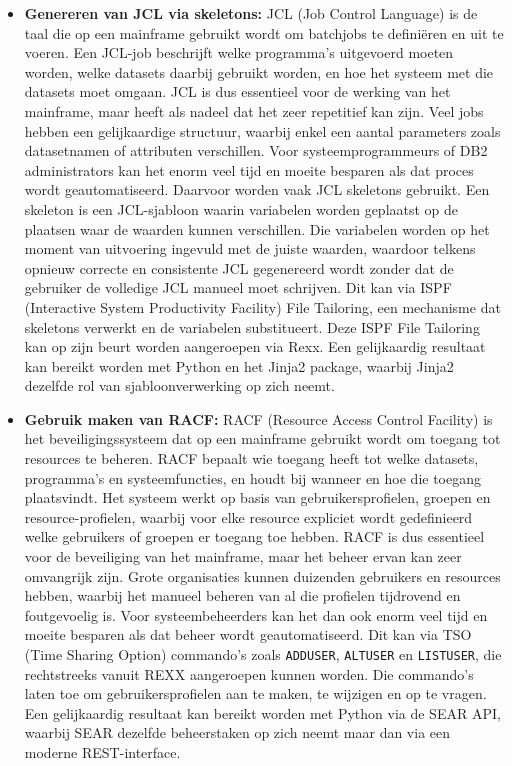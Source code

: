 \begin{itemize}
    \item \textbf{Genereren van JCL via skeletons:} JCL (Job Control Language) is de taal die op een mainframe gebruikt wordt om batchjobs te definiëren en uit te voeren. Een JCL-job beschrijft welke programma's uitgevoerd moeten worden, welke datasets daarbij gebruikt worden, en hoe het systeem met die datasets moet omgaan. JCL is dus essentieel voor de werking van het mainframe, maar heeft als nadeel dat het zeer repetitief kan zijn. Veel jobs hebben een gelijkaardige structuur, waarbij enkel een aantal parameters zoals datasetnamen of attributen verschillen. Voor systeemprogrammeurs of DB2 administrators kan het enorm veel tijd en moeite besparen als dat proces wordt geautomatiseerd. Daarvoor worden vaak JCL skeletons gebruikt. Een skeleton is een JCL-sjabloon waarin variabelen worden geplaatst op de plaatsen waar de waarden kunnen verschillen. Die variabelen worden op het moment van uitvoering ingevuld met de juiste waarden, waardoor telkens opnieuw correcte en consistente JCL gegenereerd wordt zonder dat de gebruiker de volledige JCL manueel moet schrijven. Dit kan via ISPF (Interactive System Productivity Facility) File Tailoring, een mechanisme dat skeletons verwerkt en de variabelen substitueert. Deze ISPF File Tailoring kan op zijn beurt worden aangeroepen via Rexx. Een gelijkaardig resultaat kan bereikt worden met Python en het Jinja2 package, waarbij Jinja2 dezelfde rol van sjabloonverwerking op zich neemt.
    \item \textbf{Gebruik maken van RACF:} RACF (Resource Access Control Facility) is het beveiligingssysteem dat op een mainframe gebruikt wordt om toegang tot resources te beheren. RACF bepaalt wie toegang heeft tot welke datasets, programma's en systeemfuncties, en houdt bij wanneer en hoe die toegang plaatsvindt. Het systeem werkt op basis van gebruikersprofielen, groepen en resource-profielen, waarbij voor elke resource expliciet wordt gedefinieerd welke gebruikers of groepen er toegang toe hebben. RACF is dus essentieel voor de beveiliging van het mainframe, maar het beheer ervan kan zeer omvangrijk zijn. Grote organisaties kunnen duizenden gebruikers en resources hebben, waarbij het manueel beheren van al die profielen tijdrovend en foutgevoelig is. Voor systeembeheerders kan het dan ook enorm veel tijd en moeite besparen als dat beheer wordt geautomatiseerd. Dit kan via TSO (Time Sharing Option) commando's zoals \texttt{ADDUSER}, \texttt{ALTUSER} en \texttt{LISTUSER}, die rechtstreeks vanuit REXX aangeroepen kunnen worden. Die commando's laten toe om gebruikersprofielen aan te maken, te wijzigen en op te vragen. Een gelijkaardig resultaat kan bereikt worden met Python via de SEAR API, waarbij SEAR dezelfde beheerstaken op zich neemt maar dan via een moderne REST-interface.
\end{itemize}

